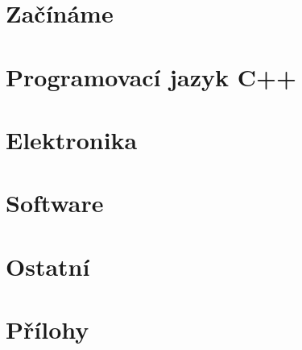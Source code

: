 \documentclass[12pt]{report} %
\begin{document}


\tableofcontents %

\chapter{Začínáme}
	
	

\chapter{Programovací jazyk C++}
	
	
	

\chapter{Elektronika}
	
	
	
	
	
	
	
	
\chapter{Software}
	
	
 
\chapter{Ostatní}
	
	


\chapter*{Přílohy}  
	
	
  \printindex %

\end{document}
